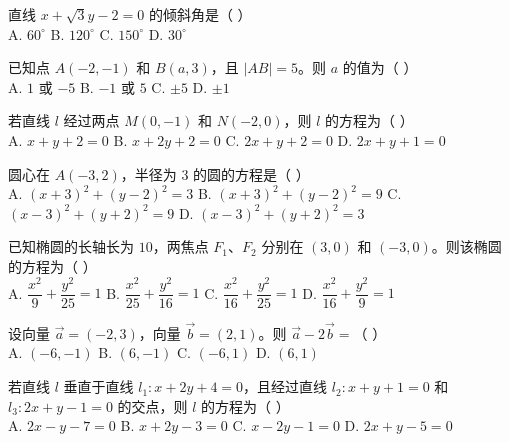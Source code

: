 \documentclass[11pt, a4paper]{article}
\begin{document}
\begin{baitap}[13]
直线 $x+\sqrt{3}y-2=0$ 的倾斜角是（ ）\\[4pt]
A. $60^\circ$ \quad B. $120^\circ$ \quad C. $150^\circ$ \quad D. $30^\circ$
\end{baitap}

\begin{baitap}[14]
已知点 $A(-2,-1)$ 和 $B(a,3)$，且 $|AB|=5$。则 $a$ 的值为（ ）\\[4pt]
A. $1$ 或 $-5$ \quad B. $-1$ 或 $5$ \quad C. $\pm 5$ \quad D. $\pm 1$
\end{baitap}

\begin{baitap}[15]
若直线 $l$ 经过两点 $M(0,-1)$ 和 $N(-2,0)$，则 $l$ 的方程为（ ）\\[4pt]
A. $x+y+2=0$ \quad B. $x+2y+2=0$ \quad C. $2x+y+2=0$ \quad D. $2x+y+1=0$
\end{baitap}

\begin{baitap}[16]
圆心在 $A(-3,2)$，半径为 $3$ 的圆的方程是（ ）\\[4pt]
A. $(x+3)^2+(y-2)^2=3$ \quad B. $(x+3)^2+(y-2)^2=9$ \quad C. $(x-3)^2+(y+2)^2=9$ \quad D. $(x-3)^2+(y+2)^2=3$
\end{baitap}

\begin{baitap}[17]
已知椭圆的长轴长为 $10$，两焦点 $F_1$、$F_2$ 分别在 $(3,0)$ 和 $(-3,0)$。则该椭圆的方程为（ ）\\[4pt]
A. $\dfrac{x^2}{9}+\dfrac{y^2}{25}=1$ \quad B. $\dfrac{x^2}{25}+\dfrac{y^2}{16}=1$ \quad C. $\dfrac{x^2}{16}+\dfrac{y^2}{25}=1$ \quad D. $\dfrac{x^2}{16}+\dfrac{y^2}{9}=1$
\end{baitap}

\begin{baitap}[18]
设向量 $\vec{a}=(-2,3)$，向量 $\vec{b}=(2,1)$。则 $\vec{a}-2\vec{b}=$（ ）\\[4pt]
A. $(-6,-1)$ \quad B. $(6,-1)$ \quad C. $(-6,1)$ \quad D. $(6,1)$
\end{baitap}

\begin{baitap}[19]
若直线 $l$ 垂直于直线 $l_1:x+2y+4=0$，且经过直线 $l_2:x+y+1=0$ 和 $l_3:2x+y-1=0$ 的交点，则 $l$ 的方程为（ ）\\[4pt]
A. $2x-y-7=0$ \quad B. $x+2y-3=0$ \quad C. $x-2y-1=0$ \quad D. $2x+y-5=0$
\end{baitap}

\end{document}

